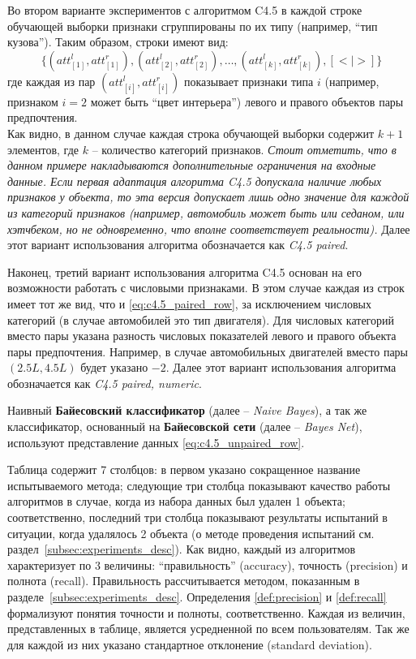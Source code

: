 	Во втором варианте экспериментов с алгоритмом C4.5 в каждой строке обучающей выборки признаки сгруппированы по их типу (например, ``тип кузова''). Таким образом, строки имеют вид:
	\begin{equation}
	\label{eq:c4.5_paired_row}
	\{(att_{[1]}^l, att_{[1]}^r), (att_{[2]}^l, att_{[2]}^r), \dots, (att_{[k]}^l, att_{[k]}^r), [< | >]\}
	\end{equation}
	где каждая из пар $(att_{[i]}^l, att_{[i]}^r)$ показывает признаки типа $i$ (например, признаком $i=2$ может быть ``цвет интерьера'') левого и правого объектов пары предпочтения. \\
	Как видно, в данном случае каждая строка обучающей выборки содержит $k + 1$ элементов, где $k$ – количество категорий признаков. \emph{Стоит отметить, что в данном примере накладываются дополнительные ограничения на входные данные. Если первая адаптация алгоритма C4.5 допускала наличие любых признаков у объекта, то эта версия допускает лишь одно значение для каждой из категорий признаков (например, автомобиль может быть или седаном, или хэтчбеком, но не одновременно, что вполне соответствует реальности).} Далее этот вариант использования алгоритма обозначается как \emph{C4.5 paired}.
	
	Наконец, третий вариант использования алгоритма C4.5 основан на его возможности работать с числовыми признаками. В этом случае каждая из строк имеет тот же вид, что и \eqref{eq:c4.5_paired_row}, за исключением числовых категорий (в случае автомобилей это тип двигателя). Для числовых категорий вместо пары указана разность числовых показателей левого и правого объекта пары предпочтения. Например, в случае автомобильных двигателей вместо пары $(2.5L, 4.5L)$ будет указано $-2$. Далее этот вариант использования алгоритма обозначается как \emph{C4.5 paired, numeric}. 
	
	Наивный \textbf{Байесовский классификатор} (далее – \emph{Naive Bayes}), а так же классификатор, основанный на \textbf{Байесовской сети} (далее – \emph{Bayes Net}), используют представление данных \eqref{eq:c4.5_unpaired_row}. 

	Таблица содержит 7 столбцов: в первом указано сокращенное название испытываемого метода; следующие три столбца показывают качество работы алгоритмов в случае, когда из набора данных был удален 1 объекта; соответственно, последний три столбца показывают результаты испытаний в ситуации, когда удалялось 2 объекта (о методе проведения испытаний см. раздел~\ref{subsec:experiments_desc}). Как видно, каждый из алгоритмов характеризует по 3 величины: ``правильность'' (accuracy), точность (precision) и полнота (recall). Правильность рассчитывается методом, показанным в разделе~\ref{subsec:experiments_desc}. Определения \ref{def:precision} и \ref{def:recall} формализуют понятия точности и полноты, соответственно. Каждая из величин, представленных в таблице, является усредненной по всем пользователям. Так же для каждой из них указано стандартное отклонение (standard deviation).
	
